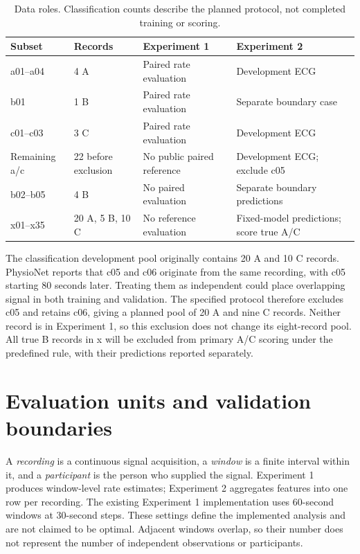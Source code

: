 \begin{table}[htbp]
\centering
\small
\caption{Data roles. Classification counts describe the planned protocol, not completed training or scoring.}
\label{tab:roles}
\begin{tabularx}{\textwidth}{@{}p{}p{}YY@{}}
\toprule
Subset & Records & Experiment 1 & Experiment 2 \\
\midrule
a01--a04 & 4 A & Paired rate evaluation & Development ECG \\
b01 & 1 B & Paired rate evaluation & Separate boundary case \\
c01--c03 & 3 C & Paired rate evaluation & Development ECG \\
Remaining a/c & 22 before exclusion & No public paired reference & Development ECG; exclude c05 \\
b02--b05 & 4 B & No paired evaluation & Separate boundary predictions \\
x01--x35 & 20 A, 5 B, 10 C & No reference evaluation & Fixed-model predictions; score true A/C \\
\bottomrule
\end{tabularx}
\end{table}

The classification development pool originally contains 20 A and 10 C records. PhysioNet reports that c05 and c06 originate from the same recording, with c05 starting 80 seconds later. Treating them as independent could place overlapping signal in both training and validation. The specified protocol therefore excludes c05 and retains c06, giving a planned pool of 20 A and nine C records. Neither record is in Experiment 1, so this exclusion does not change its eight-record pool. All true B records in x will be excluded from primary A/C scoring under the predefined rule, with their predictions reported separately.

\section{Evaluation units and validation boundaries}
A \emph{recording} is a continuous signal acquisition, a \emph{window} is a finite interval within it, and a \emph{participant} is the person who supplied the signal. Experiment 1 produces window-level rate estimates; Experiment 2 aggregates features into one row per recording. The existing Experiment 1 implementation uses 60-second windows at 30-second steps. These settings define the implemented analysis and are not claimed to be optimal. Adjacent windows overlap, so their number does not represent the number of independent observations or participants.

